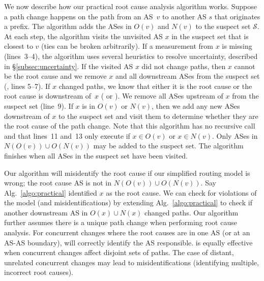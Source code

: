 We now describe how our practical root cause analysis algorithm works.
Suppose a path change happens on the path from an AS~$v$ to another AS
$s$ that originates a prefix.  The algorithm adds the ASes in $O(v)$ and
$N(v)$ to the suspect set $\mathcal{S}$.  At each step, the algorithm
visits the unvisited AS $x$ in the suspect set that is closest to $v$
(ties can be broken arbitrarily).  If a
measurement from $x$ is missing (lines~3--4), the algorithm uses several
heuristics to resolve uncertainty, described in
\S\ref{subsec:uncertainty}.  If the visited AS $x$ did not change paths,
then $x$ cannot be the root cause and we remove $x$ and all downstream
ASes from the suspect set (\localC{}, lines 5--7).  If $x$ changed
paths, we know that either it is the root cause or the root cause is
downstream of~$x$ (\neighborC{} or \downstreamC{}).  We remove all ASes
upstream of $x$ from the suspect set (line~9).  If $x$ is in $O(v)$ or
$N(v)$, then we add any new ASes downstream of $x$ to the suspect set
and visit them to determine whether they are the root cause of the path
change.  Note that this algorithm has no recursive call and that
lines~11 and~13 only execute if $x \in O(v)$ or $x \in N(v)$.  Only ASes
in $N(O(v)) \cup O(N(v))$ may be added to the suspect set.  The
algorithm finishes when all ASes in the suspect set have been visited.

Our algorithm will misidentify the root cause if our simplified routing
model is wrong; \ie the root cause AS is not in $N(O(v)) \cup O(N(v))$.
Say Alg.~\ref{algo:practical} identified $x$ as the root cause.  We can
check for violations of the model (and misidentifications) by extending
Alg.~\ref{algo:practical} to check if another downstream AS in $O(x)
\cup N(x)$ changed paths.  Our algorithm further assumes there is a
unique path change when performing root cause analysis.  For concurrent
changes where the root causes are in one AS (or at an AS-AS boundary),
\ouralgo will correctly identify the AS responsible.  \ouralgo is
equally effective when concurrent changes affect disjoint sets of paths.
The case of distant, unrelated concurrent changes may lead to
misidentifications (\eg identifying multiple, incorrect root causes).


